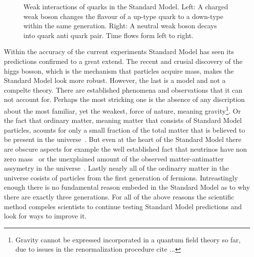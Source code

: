 \begin{figure}[h]
  {\sffamily }
  \caption{Weak interactions of quarks in the Standard Model. Left: A charged weak boson changes the flavour of a up-type quark to a down-type within the same generation.
           Right: A neutral weak boson decays into quark anti quark pair. Time flows form left to right.}
  \label{WeakInteractions}
\end{figure}

Within the accuracy of the current experiments Standard Model has seen its predictions confirmed to a great extend.
The recent and crusial discovery of the higgs bosson, which is the mechanism that particles acquire mass, makes the Standard Model look
more robust. However, the last is a model and not a compelte theory. There are established phenomena and observations that it can not
account for. Perhaps the most stricking one is the absence of any discription about the most familiar, yet the weakest, force of nature,
meaning gravity\footnote{Gravity cannot be expressed incorporated in a quantum field theory so far, due to issues in the renormalization procedure {\color{red} cite ...}}.
Or the fact that ordinary matter, meaning matter that consists of Standard Model particles, acounts for only a small fraction of the total matter
that is believed to be present in the universe~\cite{dmatter-Hinshaw}. But even at the heart of the Standard Model there are obscure aspects for example the well established fact
that neutrinos have non zero mass~\cite{nu-mass-superkam,nu-mass-kamland,nu-mass-sno,nu-mass-daya} or the unexplained amount of the observed
matter-antimatter assymetry in the universe~\cite{more-cpv-huet,more-cpv-gavela_I,more-cpv-gavela_II}.
Lastly nearly all of the ordinarry matter in the universe cosists of
particles from the first generation of fermions. Intreastingly enough there is no fundamental reason embeded in the Standard Model
as to why there are exactly three generations. For all of the above reasons the scientific method compeles scientists to continue
testing Standard Model predictions and look for ways to improve it.
